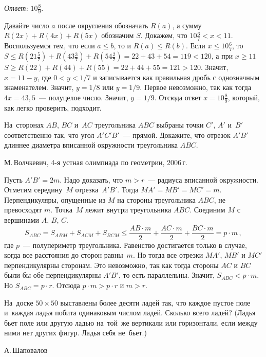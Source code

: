 \ifincludesolutions
\emph{Ответ:} $10 \frac{8}{9}$.
\par
Давайте число $a$ после округления обозначать $R(a)$, а сумму
$R(2 x) + R(4 x) + R(5 x)$ обозначим $S$.
Докажем, что $10 \frac{6}{7} < x < 11$.
Воспользуемся тем, что если $a \leq b$, то и $R(a) \leq R(b)$.
Если $x \leq 10 \frac{6}{7}$,
то \(
    S
\leq
    R(21 \frac{5}{7}) + R(43\frac{3}{7}) + R(54 \frac{2}{7})
=
    22 + 43 + 54
=
    119
<
    120
\), а при $x \geq 11$
\(
    S
\geq
    R(22) + R(44) + R(55)
=
    22 + 44 + 55
=
    121 > 120
\).
Значит, $x = 11 - y$, где $0 < y < 1 / 7$ и записывается как правильная дробь
с однозначным знаменателем.
Значит, $y = 1 / 8$ или $y = 1 / 9$.
Первое невозможно, так как тогда $4 x = 43{,}5$~--- полуцелое число.
Значит, $y = 1 / 9$.
Отсюда ответ $x = 10 \frac{8}{9}$, который, как легко проверить, подходит.
\fi %

\begin{problems}

\item
На~сторонах $AB$, $BC$ и~$AC$ треугольника $ABC$ выбраны
точки $C'$, $A'$ и~$B'$ соответственно так, что угол $A'C'B'$~--- прямой.
Докажите, что отрезок $A'B'$ длиннее диаметра вписанной окружности
треугольника $ABC$.
\begingroup\em\small\par\strut\hfill
    М.\,Волчкевич, 4-я устная олимпиада по геометрии, 2006\,г.
\endgroup
\end{problems}

\ifincludesolutions
Пусть $A'B' = 2 m$.
Надо доказать, что $m > r$~--- радиуса вписанной окружности.
Отметим середину~$M$ отрезка~$A'B'$.
Тогда $MA' = MB' = MC' = m$.
Перпендикуляры, опущенные из $M$ на стороны треугольника $ABC$,
не превосходят $m$.
Точка~$M$ лежит внутри треугольника $ABC$.
Соединим $M$ с вершинами $A$, $B$, $C$.
\[
    S_{ABC}
=
    S_{ABM} + S_{ACM} + S_{BCM}
\leq
    \frac{AB \cdot m}{2}
    +
    \frac{AC \cdot m}{2}
    +
    \frac{BC \cdot m}{2}
=
    p \cdot m
\,,\]
где $p$~--- полупериметр треугольника.
Равенство достигается только в случае, когда все расстояния до сторон
равны~$m$.
Но тогда все отрезки $MA'$, $MB'$ и $MC'$ перпендикулярны сторонам.
Это невозможно, так как тогда стороны $AC$ и $BC$ были бы обе перпендикулярны
$A'B'$, то есть параллельны.
Значит, $S_{ABC} < p \cdot m$.
Но $S_{ABC} = p \cdot r$.
Отсюда $p \cdot m > p \cdot r$ и $m > r$.
\fi %

\begin{problems}

\item
На~доске $50 \times 50$ выставлены более десяти ладей так, что каждое пустое
поле и~каждая ладья побита одинаковым числом ладей.
Сколько всего ладей?
(Ладья бьет поле или другую ладью на~той~же вертикали или горизонтали, если
между ними нет других фигур.
Ладья себя не~бьет.)
\begingroup\em\small\par\strut\hfill
    А.\,Шаповалов
\endgroup
\end{problems}

